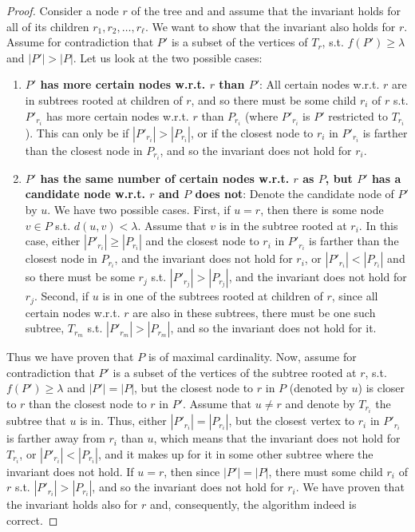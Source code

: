 \documentclass[a4paper,UKenglish]{lipics-v2016}
\theoremstyle{plain}
\begin{document}
\begin{proof}
Consider a node $r$ of the tree and and assume that the invariant holds for all of its children $r_{1},r_{2},\ldots,r_{\ell}$.
We want to show that the invariant also holds for $r$.
Assume for contradiction that $P'$ is a subset of the vertices of $T_r$, s.t. $f(P')\geq\lambda$ and $|P'| > |P|$. Let us look at the two possible cases:
\begin{enumerate}
\item \textbf{\boldmath$P'$ has more certain nodes w.r.t. \boldmath$r$ than \boldmath$P'$}: All certain nodes w.r.t. $r$ are in subtrees rooted at children of $r$, and so there must be some child $r_{i}$ of $r$ s.t. $P'_{r_i}$ has more certain nodes w.r.t. $r$ than $P_{r_i}$ (where $P'_{r_i}$ is $P'$ restricted to $T_{r_i}$). This can only be if $|P'_{r_i}| > |P_{r_i}|$, or if the closest node to $r_i$ in $P'_{r_i}$ is farther than the closest node in $P_{r_i}$, and so the invariant does not hold for $r_i$.
\item \textbf{\boldmath$P'$ has the same number of certain nodes w.r.t. \boldmath$r$ as \boldmath$P$, but \boldmath$P'$ has a candidate node w.r.t. \boldmath$r$  and \boldmath$P$ does not}: Denote the candidate node of $P'$ by $u$. We have two possible cases. First, if $u=r$, then there is some node $v \in P$ s.t. $d(u,v)<\lambda$. Assume that $v$ is in the subtree rooted at $r_i$. In this case, either $|P'_{r_i}| \geq |P_{r_i}|$ and the closest node to $r_i$ in $P'_{r_i}$ is farther than the closest node in $P_{r_i}$, and the invariant does not hold for $r_i$, or $|P'_{r_i}|<|P_{r_i}|$ and so there must be some $r_j$ s.t. $|P'_{r_j}|>|P_{r_j}|$, and the invariant does not hold for $r_j$. Second, if $u$ is in one of the subtrees rooted at children of $r$, since all certain nodes w.r.t. $r$ are also in these subtrees, there must be one such subtree, $T_{r_m}$ s.t. $|P'_{r_m}| > |P_{r_m}|$, and so the invariant does not hold for it.
\end{enumerate} 
Thus we have proven that $P$ is of maximal cardinality. Now, assume for contradiction that $P'$ is a subset of the vertices of the subtree rooted at $r$, s.t. $f(P')\geq\lambda$ and $|P'| = |P|$, but the closest node to $r$ in $P$ (denoted by $u$) is closer to $r$ than the closest node to $r$ in $P'$. Assume that $u \neq r$ and denote by $T_{r_i}$ the subtree that $u$ is in. Thus, either $|P'_{r_i}| = |P_{r_i}|$, but the closest vertex to $r_i$ in $P'_{r_i}$ is farther away from $r_i$ than $u$, which means that the invariant does not hold for $T_{r_i}$, or $|P'_{r_i}| < |P_{r_i}|$, and it makes up for it in some other subtree where the invariant does not hold. If $u=r$, then since $|P'| = |P|$, there must some child $r_{i}$ of $r$ s.t. $|P'_{r_i}| > |P_{r_i}|$, and so the invariant does not hold for $r_i$. We have proven that the invariant holds also for $r$ and, consequently, the algorithm indeed is correct.
\end{proof}
\basicpartitioninglemma*
\end{document}
